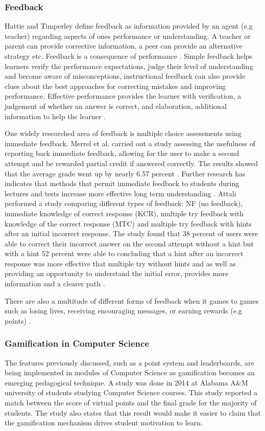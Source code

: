 \documentclass[12pt,a4paper]{article}
\begin{document}
\subsubsection{Feedback} 
Hattie and Timperley define feedback as information provided by an agent (e.g teacher) regarding aspects of ones performance or understanding. A teacher or parent can provide corrective information, a peer can provide an alternative strategy etc. Feedback is a consequence of performance \cite{hattie2007power}. Simple feedback helps learners verify the performance expectations, judge their level of understanding and become aware of misconceptions, instructional feedback can also provide clues about the best approaches for correcting mistakes and improving performance. Effective performance provides the learner with verification, a judgement of whether an answer is correct, and elaboration, additional information to help the learner \cite{attali2015effects1}.  

One widely researched area of feedback is multiple choice assessments using immediate feedback. Merrel et al. carried out a study assessing the usefulness of reporting back immediate feedback, allowing for the user to make a second attempt and be rewarded partial credit if answered correctly. The results showed that the average grade went up by nearly 6.57 percent \cite{merrel2015multiple}. Further research has indicates that methods that permit immediate feedback to students during lectures and tests increase more effective long term understanding \cite{roediger2011critical}. Attali performed a study comparing different types of feedback: NF (no feedback), immediate knowledge of correct response (KCR), multiple try feedback with knowledge of the correct response (MTC) and multiple try feedback with hints after an initial incorrect response. The study found that 38 percent of users were able to correct their incorrect answer on the second attempt without a hint but with a hint 52 percent were able to concluding that a hint after an incorrect response was more effective that multiple try without hints and as well as providing an opportunity to understand the initial error, provides more information and a clearer path \cite{attali2015effects2}.      

There are also a multitude of different forms of feedback when it games to games such as losing lives, receiving encouraging messages, or earning rewards (e.g points) \cite{adams2015cybersecurity2}.


\subsubsection{Gamification in Computer Science} 
The features previously discussed, such as a point system and leaderboards, are being implemented in modules of Computer Science as gamification becomes an emerging pedagogical technique. A study was done in 2014 at Alabama A\&M university \cite{fu2016gamification} of students studying Computer Science courses. This study reported a match between the score of virtual points and the final grade for the majority of students. The study also states that this result would make it easier to claim that the gamification mechanism drives student motivation to learn.  
\end{document}
